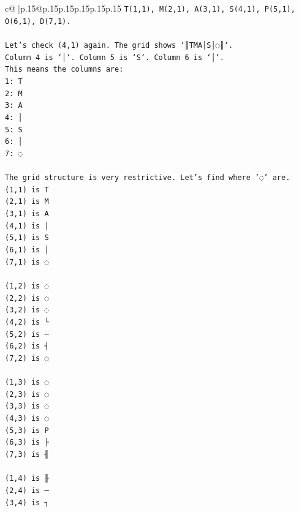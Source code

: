 \documentclass{article}
\begin{document}
{\begin{supertabular}{c@{$\;$}|p{.15\linewidth}@{}p{.15\linewidth}p{.15\linewidth}p{.15\linewidth}p{.15\linewidth}p{.15\linewidth}}
{{{\texttt{T(1,1), M(2,1), A(3,1), S(4,1), P(5,1), O(6,1), D(7,1).} \\
\\ 
\texttt{Let's check (4,1) again. The grid shows `║TMA│S│◌║`.} \\
\texttt{Column 4 is `│`. Column 5 is `S`. Column 6 is `│`.} \\
\texttt{This means the columns are:} \\
\texttt{1: T} \\
\texttt{2: M} \\
\texttt{3: A} \\
\texttt{4: │} \\
\texttt{5: S} \\
\texttt{6: │} \\
\texttt{7: ◌} \\
\\ 
\texttt{The grid structure is very restrictive. Let's find where '◌' are.} \\
\texttt{(1,1) is T} \\
\texttt{(2,1) is M} \\
\texttt{(3,1) is A} \\
\texttt{(4,1) is │} \\
\texttt{(5,1) is S} \\
\texttt{(6,1) is │} \\
\texttt{(7,1) is ◌} \\
\\ 
\texttt{(1,2) is ◌} \\
\texttt{(2,2) is ◌} \\
\texttt{(3,2) is ◌} \\
\texttt{(4,2) is └} \\
\texttt{(5,2) is ─} \\
\texttt{(6,2) is ┤} \\
\texttt{(7,2) is ◌} \\
\\ 
\texttt{(1,3) is ◌} \\
\texttt{(2,3) is ◌} \\
\texttt{(3,3) is ◌} \\
\texttt{(4,3) is ◌} \\
\texttt{(5,3) is P} \\
\texttt{(6,3) is ├} \\
\texttt{(7,3) is ╢} \\
\\ 
\texttt{(1,4) is ╟} \\
\texttt{(2,4) is ─} \\
\texttt{(3,4) is ┐} \\
}}}
\end{supertabular}}
\end{document}
